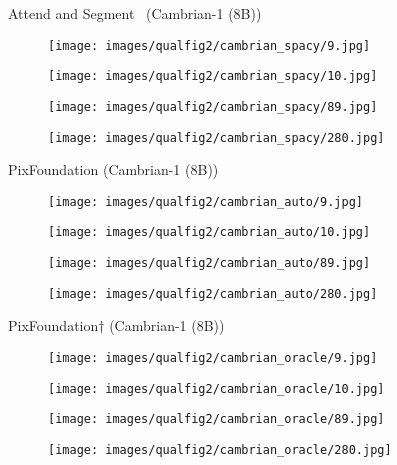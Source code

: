 \begin{figure}[t]
\centering
Attend and Segment~\cite{cao2024emerging} (Cambrian-1 (8B))

\begin{subfigure}{0.12\textwidth}
\texttt{[image: images/qualfig2/cambrian\_spacy/9.jpg]}
\end{subfigure}%
\begin{subfigure}{0.12\textwidth}
\texttt{[image: images/qualfig2/cambrian\_spacy/10.jpg]}
\end{subfigure}%
\begin{subfigure}{0.12\textwidth}
\texttt{[image: images/qualfig2/cambrian\_spacy/89.jpg]}
\end{subfigure}%
\begin{subfigure}{0.12\textwidth}
\texttt{[image: images/qualfig2/cambrian\_spacy/280.jpg]}
\end{subfigure} 

PixFoundation (Cambrian-1 (8B))

\begin{subfigure}{0.12\textwidth}
\texttt{[image: images/qualfig2/cambrian\_auto/9.jpg]}
\end{subfigure}%
\begin{subfigure}{0.12\textwidth}
\texttt{[image: images/qualfig2/cambrian\_auto/10.jpg]}
\end{subfigure}%
\begin{subfigure}{0.12\textwidth}
\texttt{[image: images/qualfig2/cambrian\_auto/89.jpg]}
\end{subfigure}%
\begin{subfigure}{0.12\textwidth}
\texttt{[image: images/qualfig2/cambrian\_auto/280.jpg]}
\end{subfigure}

PixFoundation$\dagger$ (Cambrian-1 (8B))

\begin{subfigure}{0.12\textwidth}
\texttt{[image: images/qualfig2/cambrian\_oracle/9.jpg]}
\caption{}
\end{subfigure}%
\begin{subfigure}{0.12\textwidth}
\texttt{[image: images/qualfig2/cambrian\_oracle/10.jpg]}
\caption{}
\end{subfigure}%
\begin{subfigure}{0.12\textwidth}
\texttt{[image: images/qualfig2/cambrian\_oracle/89.jpg]}
\caption{}
\end{subfigure}%
\begin{subfigure}{0.12\textwidth}
\texttt{[image: images/qualfig2/cambrian\_oracle/280.jpg]}
\caption{}
\end{subfigure}


\end{figure}
